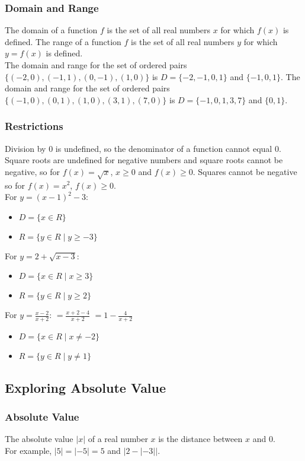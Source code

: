 \documentclass{article}
\begin{document}
	\subsubsection{Domain and Range}
	The domain of a function $f$ is the set of all real numbers $x$ for which $f(x)$ is defined. The range of a function $f$ is the set of all real numbers $y$ for which $y=f(x)$  is defined.\\
	The domain and range for the set of ordered pairs $\{(-2, 0), (-1, 1), (0, -1), (1, 0)\}$ is $D=\{-2, -1, 0, 1\}$ and $\{-1, 0, 1\}$. The domain and range for the set of ordered pairs $\{(-1, 0), (0, 1), (1, 0), (3, 1), (7, 0)\}$ is $D=\{-1, 0, 1, 3, 7\}$ and $\{0, 1\}$.
	\subsubsection{Restrictions}
	Division by 0 is undefined, so the denominator of a function cannot equal 0. Square roots are undefined for negative numbers and square roots cannot be negative, so for $f(x)=\sqrt{x}$, $x\geq0$ and $f(x)\geq0$. Squares cannot be negative so for $f(x)=x^2$, $f(x)\geq0$.\\
	For $y=(x-1)^2-3$:
	\begin{itemize}
		\item $D=\{x\in R\}$
		\item $R=\{y\in R\mid y\geq-3\}$
	\end{itemize}
	For $y=2+\sqrt{x-3}$:
	\begin{itemize}
		\item $D=\{x\in R\mid x\geq3\}$
		\item $R=\{y\in R\mid y\geq2\}$
	\end{itemize}
	For $y=\frac{x-2}{x+2}$: $=\frac{x+2-4}{x+2}$ $=1-\frac{4}{x+2}$
	\begin{itemize}
		\item $D=\{x\in R\mid x\neq-2\}$
		\item $R=\{y\in R\mid y\neq1\}$
	\end{itemize}
	\subsection{Exploring Absolute Value}
	\subsubsection{Absolute Value}
	The absolute value $|x|$ of a real number $x$ is the distance between $x$ and 0.\\
	For example, $|5|=|-5|=5$ and $\left|2-\left|-3\right|\right|$.
\end{document}
